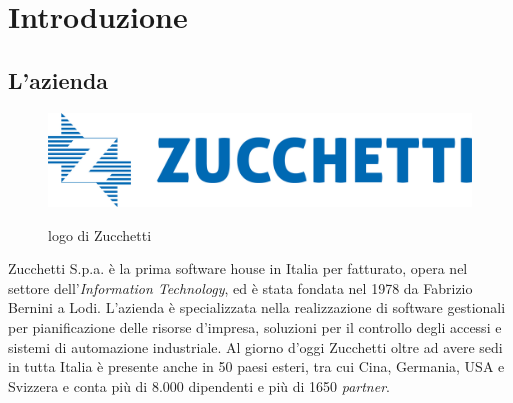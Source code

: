 \chapter{Introduzione}
\label{chap:introduzione}









\section{L'azienda}
\begin{figure}[h!]
    \centering
    \includegraphics[alt={Testo alternativo dell'immagine}, width=0.7\columnwidth]{img/logoZucchetti.jpeg}
    \caption{logo di Zucchetti}
    \label{fig:entanglement}
\end{figure}
Zucchetti S.p.a. è la prima software house in Italia per fatturato, opera nel settore dell'\textit{Information Technology}, ed è stata fondata nel 1978 da Fabrizio Bernini a Lodi. 
L'azienda è specializzata nella realizzazione di software gestionali per pianificazione delle risorse d'impresa, soluzioni per il controllo degli accessi e sistemi di automazione industriale. 
Al giorno d'oggi Zucchetti oltre ad avere sedi in tutta Italia è presente anche in 50 paesi esteri, tra cui Cina, Germania, USA e Svizzera e conta più di 8.000 dipendenti e più di 1650 \textit{partner}.


